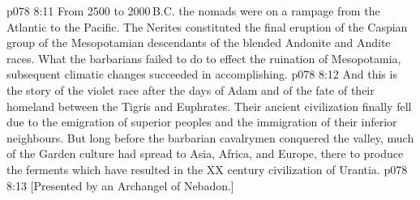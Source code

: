 \vs p078 8:11 From 2500 to 2000\,B.C. the nomads were on a rampage from the Atlantic to the Pacific. The Nerites constituted the final eruption of the Caspian group of the Mesopotamian descendants of the blended Andonite and Andite races. What the barbarians failed to do to effect the ruination of Mesopotamia, subsequent climatic changes succeeded in accomplishing.
\vs p078 8:12 \pc And this is the story of the violet race after the days of Adam and of the fate of their homeland between the Tigris and Euphrates. Their ancient civilization finally fell due to the emigration of superior peoples and the immigration of their inferior neighbours. But long before the barbarian cavalrymen conquered the valley, much of the Garden culture had spread to Asia, Africa, and Europe, there to produce the ferments which have resulted in the XX century civilization of Urantia.
\vsetoff
\vs p078 8:13 [Presented by an Archangel of Nebadon.]
\quizlink
